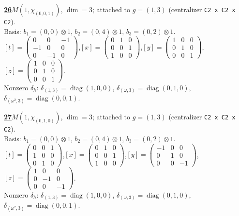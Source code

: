 \begin{samepage}\noindent\textbf{\underline{26}}\quad $M(1,\chi_{(0,0,1)})$, $\dim=3$; attached to $g=(1,3)$ (centralizer \texttt{C2 x C2 x C2}).\\
Basis: $b_{1}=(0,0)\otimes 1$, $b_{2}=(0,4)\otimes 1$, $b_{3}=(0,2)\otimes 1$.\\
$[t]=\left(\begin{smallmatrix} 0 & 0 & -1 \\ -1 & 0 & 0 \\ 0 & -1 & 0 \end{smallmatrix}\right)$,\quad $[x]=\left(\begin{smallmatrix} 0 & 1 & 0 \\ 0 & 0 & 1 \\ 1 & 0 & 0 \end{smallmatrix}\right)$,\quad $[y]=\left(\begin{smallmatrix} 1 & 0 & 0 \\ 0 & 1 & 0 \\ 0 & 0 & 1 \end{smallmatrix}\right)$,\quad $[z]=\left(\begin{smallmatrix} 1 & 0 & 0 \\ 0 & 1 & 0 \\ 0 & 0 & 1 \end{smallmatrix}\right)$.\\
Nonzero $\delta_h$: $\delta_{(1,3)}=\operatorname{diag}(1,0,0)$, $\delta_{(\omega,3)}=\operatorname{diag}(0,1,0)$, $\delta_{(\omega^2,3)}=\operatorname{diag}(0,0,1)$.\end{samepage}
\medskip

\begin{samepage}\noindent\textbf{\underline{27}}\quad $M(1,\chi_{(0,1,0)})$, $\dim=3$; attached to $g=(1,3)$ (centralizer \texttt{C2 x C2 x C2}).\\
Basis: $b_{1}=(0,0)\otimes 1$, $b_{2}=(0,4)\otimes 1$, $b_{3}=(0,2)\otimes 1$.\\
$[t]=\left(\begin{smallmatrix} 0 & 0 & 1 \\ 1 & 0 & 0 \\ 0 & 1 & 0 \end{smallmatrix}\right)$,\quad $[x]=\left(\begin{smallmatrix} 0 & 1 & 0 \\ 0 & 0 & 1 \\ 1 & 0 & 0 \end{smallmatrix}\right)$,\quad $[y]=\left(\begin{smallmatrix} -1 & 0 & 0 \\ 0 & 1 & 0 \\ 0 & 0 & -1 \end{smallmatrix}\right)$,\quad $[z]=\left(\begin{smallmatrix} 1 & 0 & 0 \\ 0 & -1 & 0 \\ 0 & 0 & -1 \end{smallmatrix}\right)$.\\
Nonzero $\delta_h$: $\delta_{(1,3)}=\operatorname{diag}(1,0,0)$, $\delta_{(\omega,3)}=\operatorname{diag}(0,1,0)$, $\delta_{(\omega^2,3)}=\operatorname{diag}(0,0,1)$.\end{samepage}
\medskip

